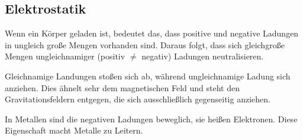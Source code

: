 




%
%	





\subsection{Elektrostatik}

Wenn ein Körper geladen ist, bedeutet das, dass positive und negative Ladungen in ungleich große Mengen vorhanden sind. Daraus folgt, dass sich gleichgroße Mengen ungleichnamiger (positiv $\neq$ negativ) Ladungen neutralisieren.

Gleichnamige Landungen stoßen sich ab, während ungleichnamige Ladung sich anziehen. Dies ähnelt sehr dem magnetischen Feld und steht den Gravitationsfeldern entgegen, die sich ausschließlich gegenseitig anziehen.

In Metallen sind die negativen Ladungen beweglich, sie heißen Elektronen. Diese Eigenschaft macht Metalle zu \glqq Leitern\grqq .

